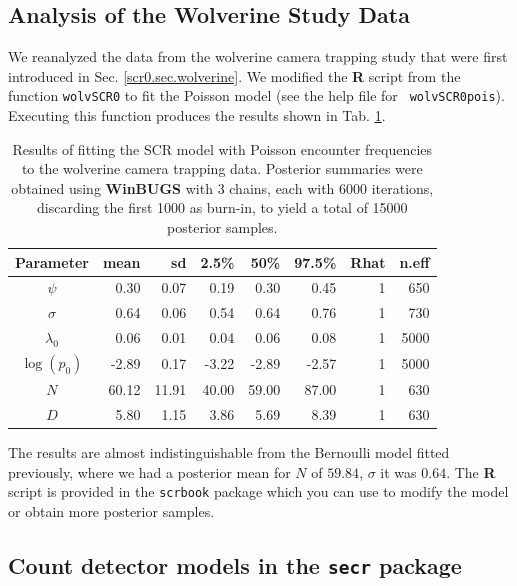 \subsection{Analysis of the Wolverine Study Data}

We reanalyzed the data from the wolverine camera trapping study that
were first introduced in Sec. \ref{scr0.sec.wolverine}.  We modified
the {\bf R} script from the function \mbox{\tt wolvSCR0} to fit the
Poisson model (see the help file for \mbox{\tt
  wolvSCR0pois}). Executing this function produces the results shown
in Tab. \ref{poisson-mn.tab.wolverine}.
\begin{table}
\centering
\caption{Results of fitting the SCR model with Poisson encounter
  frequencies to the wolverine camera trapping data.
Posterior summaries were obtained using {\bf WinBUGS} with
 3 chains, each with 6000 iterations, discarding the first 1000 as
 burn-in, to yield a total of 15000 posterior samples.
}
\begin{tabular}{crrrrrrr} \hline \hline
 Parameter & mean &  sd & 2.5\% & 50\%  & 97.5\% &Rhat& n.eff \\ \hline
$\psi$     &  0.30& 0.07& 0.19 &  0.30 & 0.45& 1 &  650 \\
$\sigma$   &  0.64& 0.06& 0.54 &  0.64 & 0.76& 1 &  730 \\
$\lambda_{0}$& 0.06& 0.01& 0.04 &  0.06 & 0.08& 1&  5000\\
$\log(p_0)$  &-2.89& 0.17& -3.22& -2.89& -2.57& 1&  5000\\
$N$        & 60.12&11.91& 40.00& 59.00& 87.00& 1&   630\\
$D$        &  5.80& 1.15& 3.86 & 5.69 & 8.39 & 1&   630\\ \hline
\end{tabular}
\label{poisson-mn.tab.wolverine}
\end{table}
The results are almost indistinguishable from the Bernoulli model
fitted previously, where we had a posterior mean for $N$ of
 $59.84$,  $\sigma$ it was
$0.64$. The {\bf R}
script is provided in the  \mbox{\tt scrbook} package which you can
use to modify the model or obtain more posterior samples.

\subsection{Count detector models in the  \mbox{\tt secr} package}

